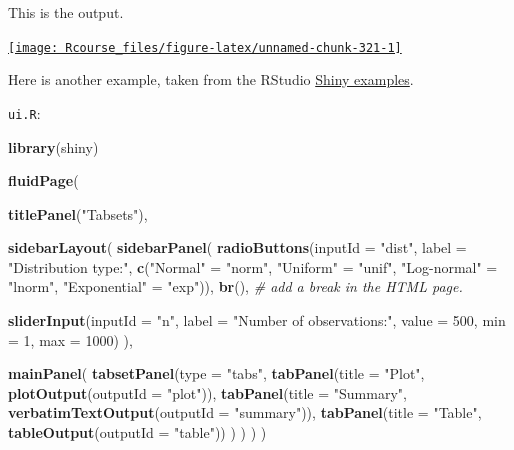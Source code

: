 \documentclass[]{book}
\newenvironment{Shaded}{\begin{snugshade}}{\end{snugshade}}
\newcommand{\KeywordTok}[1]{\textcolor[rgb]{0.13,0.29,0.53}{\textbf{#1}}}
\newcommand{\DataTypeTok}[1]{\textcolor[rgb]{0.13,0.29,0.53}{#1}}
\newcommand{\DecValTok}[1]{\textcolor[rgb]{0.00,0.00,0.81}{#1}}
\newcommand{\StringTok}[1]{\textcolor[rgb]{0.31,0.60,0.02}{#1}}
\newcommand{\CommentTok}[1]{\textcolor[rgb]{0.56,0.35,0.01}{\textit{#1}}}
\newcommand{\NormalTok}[1]{#1}
\theoremstyle{definition}
\theoremstyle{definition}
\theoremstyle{definition}
\theoremstyle{remark}
\begin{document}
This is the output.

\href{http://shiny.rstudio.com/gallery/example-01-hello.html}{\texttt{[image: Rcourse\_files/figure-latex/unnamed-chunk-321-1]} }

Here is another example, taken from the RStudio
\href{https://github.com/rstudio/shiny-examples/tree/master/006-tabsets}{Shiny
examples}.

\texttt{ui.R}:

\begin{Shaded}
\begin{Highlighting}[]
\KeywordTok{library}\NormalTok{(shiny)}

\KeywordTok{fluidPage}\NormalTok{(}
    
  \KeywordTok{titlePanel}\NormalTok{(}\StringTok{"Tabsets"}\NormalTok{),}
  
  \KeywordTok{sidebarLayout}\NormalTok{(}
    \KeywordTok{sidebarPanel}\NormalTok{(}
      \KeywordTok{radioButtons}\NormalTok{(}\DataTypeTok{inputId =} \StringTok{"dist"}\NormalTok{, }
                   \DataTypeTok{label =} \StringTok{"Distribution type:"}\NormalTok{,}
                   \KeywordTok{c}\NormalTok{(}\StringTok{"Normal"}\NormalTok{ =}\StringTok{ "norm"}\NormalTok{,}
                     \StringTok{"Uniform"}\NormalTok{ =}\StringTok{ "unif"}\NormalTok{,}
                     \StringTok{"Log-normal"}\NormalTok{ =}\StringTok{ "lnorm"}\NormalTok{,}
                     \StringTok{"Exponential"}\NormalTok{ =}\StringTok{ "exp"}\NormalTok{)),}
      \KeywordTok{br}\NormalTok{(), }\CommentTok{# add a break in the HTML page.}
      
      \KeywordTok{sliderInput}\NormalTok{(}\DataTypeTok{inputId =} \StringTok{"n"}\NormalTok{, }
                  \DataTypeTok{label =} \StringTok{"Number of observations:"}\NormalTok{, }
                   \DataTypeTok{value =} \DecValTok{500}\NormalTok{,}
                   \DataTypeTok{min =} \DecValTok{1}\NormalTok{, }
                   \DataTypeTok{max =} \DecValTok{1000}\NormalTok{)}
\NormalTok{    ),}
    
    \KeywordTok{mainPanel}\NormalTok{(}
      \KeywordTok{tabsetPanel}\NormalTok{(}\DataTypeTok{type =} \StringTok{"tabs"}\NormalTok{, }
        \KeywordTok{tabPanel}\NormalTok{(}\DataTypeTok{title =} \StringTok{"Plot"}\NormalTok{, }\KeywordTok{plotOutput}\NormalTok{(}\DataTypeTok{outputId =} \StringTok{"plot"}\NormalTok{)), }
        \KeywordTok{tabPanel}\NormalTok{(}\DataTypeTok{title =} \StringTok{"Summary"}\NormalTok{, }\KeywordTok{verbatimTextOutput}\NormalTok{(}\DataTypeTok{outputId =} \StringTok{"summary"}\NormalTok{)), }
        \KeywordTok{tabPanel}\NormalTok{(}\DataTypeTok{title =} \StringTok{"Table"}\NormalTok{, }\KeywordTok{tableOutput}\NormalTok{(}\DataTypeTok{outputId =} \StringTok{"table"}\NormalTok{))}
\NormalTok{      )}
\NormalTok{    )}
\NormalTok{  )}
\NormalTok{)}
\end{Highlighting}
\end{Shaded}
\end{document}
